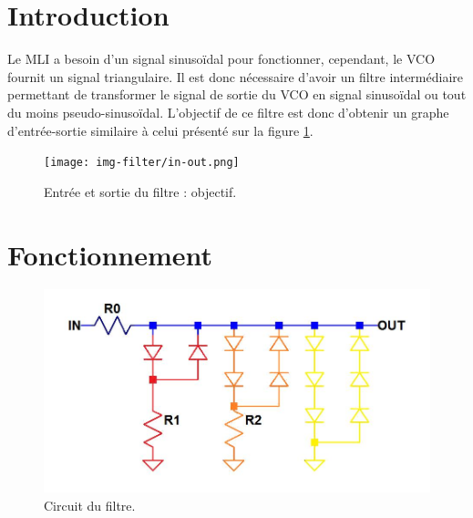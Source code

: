 

\section{Introduction}
Le MLI a besoin d'un signal sinusoïdal pour fonctionner, cependant, le VCO fournit un
signal triangulaire. Il est donc nécessaire d'avoir un filtre intermédiaire permettant
de transformer le signal de sortie du VCO en signal sinusoïdal ou tout du moins pseudo-sinusoïdal.
L'objectif de ce filtre est donc d'obtenir un graphe d'entrée-sortie similaire à
celui présenté sur la figure \ref{fig:filter-in-out}.

\begin{figure}[ht]
	\centering
	\texttt{[image: img-filter/in-out.png]}
	\caption{Entrée et sortie du filtre : objectif.}
	\label{fig:filter-in-out}
\end{figure}

\section{Fonctionnement}

\begin{figure}[ht]
	\centering
	\includegraphics[scale=0.3]{img-filter/circuit-colored.png}
	\caption{Circuit du filtre.}
	\label{fig:circuit-filtre}
\end{figure}

